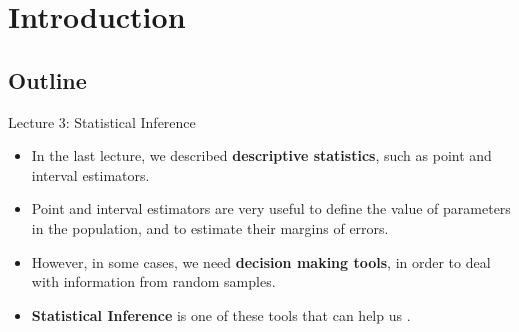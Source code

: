 \section{Introduction}

\subsection{Outline}
\begin{frame}{Lecture 3: Statistical Inference}
  \begin{itemize}
    \item In the last lecture, we described {\bf descriptive statistics}, such as point and interval estimators.\bigskip

    \item Point and interval estimators are very useful to define the value of parameters in the population, and to estimate their margins of errors.\bigskip

    \item However, in some cases, we need {\bf decision making tools}, in order to deal with information from random samples.\bigskip

    \item {\bf Statistical Inference} is one of these tools that can help us .
  \end{itemize}
\end{frame}

